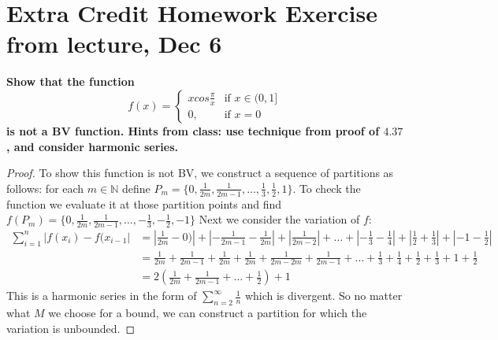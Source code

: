 \documentclass[paper=a4, fontsize=11pt]{scrartcl} %
\begin{document}
\section*{Extra Credit Homework Exercise from lecture, Dec 6 }
\boldmath
\textbf{Show that the function $$
f(x) =
\begin{cases}
xcos\frac{\pi}{x}& \text{if }x \in (0,1] \\
0, & \text{if } x =0
\end{cases}
$$ is not a BV function.  Hints from class:  use technique from proof of $4.37$, and consider harmonic series.}
\unboldmath
\begin{proof}
To show this function is not BV, we construct a sequence of partitions as follows:
\newline
for each $m \in \mathbb{N}$ define $P_m = \{0, \frac{1}{2m}, \frac{1}{2m-1}, \dots, \frac{1}{3}, \frac{1}{2}, 1 \}$.  To check the function we evaluate it at those partition points and find $f(P_m) = \{0, \frac{1}{2m}, \frac{1}{2m-1}, \dots, -\frac{1}{3}, -\frac{1}{2}, -1 \}$ 
\newline
Next we consider the variation of $f$:
\begin{align*}
\sum_{i=1}^{n} \left| f(x_i) - f(x_{i-1} \right| &= \left| \frac{1}{2m} - 0) \right| + \left|-\frac{1}{2m-1} - \frac{1}{2m} \right| + \left|\frac{1}{2m-2} \right| + \dots + \left| -\frac{1}{3} - \frac{1}{4} \right| + \left| \frac{1}{2} + \frac{1}{3} \right| + \left| -1 -\frac{1}{2} \right|
\\ &= \frac{1}{2m} + \frac{1}{2m-1} + \frac{1}{2m} + \frac{1}{2m} + \frac{1}{2m-2m} + \frac{1}{2m-1} + \dots + \frac{1}{3} + \frac{1}{4} + \frac{1}{2} + \frac{1}{3} + 1 + \frac{1}{2}
\\ &= 2(\frac{1}{2m} + \frac{1}{2m-1} + \dots +  \frac{1}{2}) + 1
\end{align*}
This is a harmonic series in the form of $\sum_{n=2}^{\infty} \frac{1}{n}$ which is divergent.  So no matter what $M$ we choose for a bound, we can construct a partition for which the variation is unbounded.
\end{proof}
\end{document}
